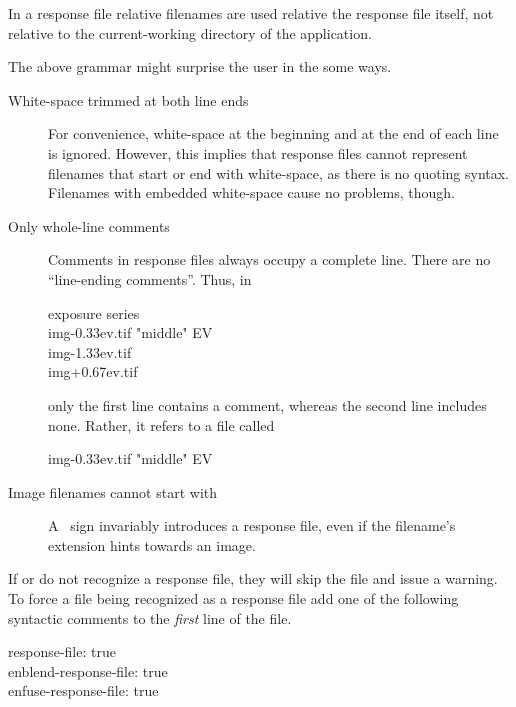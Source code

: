 In a response file relative filenames are used relative the response file itself, not relative
to the current-working directory of the application.

The above grammar might surprise the user in the some ways.

\begin{description}
\item[White-space trimmed at both line ends]\itemend
  For convenience, white-space at the beginning and at the end of each line is ignored.
  However, this implies that response files cannot represent filenames that start or end with
  white-space, as there is no quoting syntax.  Filenames with embedded white-space cause no
  problems, though.

\item[Only whole-line comments]\itemend
  Comments in response files always occupy a complete line.  There are no ``line-ending
  comments''.  Thus, in

  \begin{literal}
     exposure series \\
    img-0.33ev.tif  "middle" EV \\
    img-1.33ev.tif \\
    img+0.67ev.tif \\
  \end{literal}

  only the first line contains a comment, whereas the second line includes none.  Rather, it
  refers to a file called

  \begin{literal}
    img-0.33ev.tif  "middle" EV
  \end{literal}

\item[Image filenames cannot start with ]\itemend
  A ~sign invariably introduces a response file, even
  if the filename's extension hints towards an image.
\end{description}

%
If \App{} or \OtherApp{} do not recognize a response file, they will skip the file and issue a
warning.  To force a file being recognized as a response file add one of the following syntactic
comments to the \emph{first} line of the file.

\begin{literal}
  response-file: true \\
  enblend-response-file: true \\
  enfuse-response-file: true \\
\end{literal}

